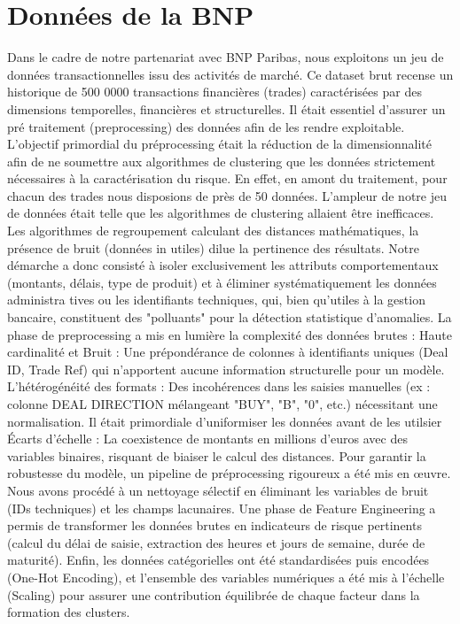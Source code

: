 \documentclass[a4paper]{article}
\begin{document}
\section{Données de la BNP}\label{sec:bnp}
Dans le cadre de notre partenariat avec BNP Paribas, nous exploitons un jeu de données transactionnelles
issu des activités de marché. Ce dataset brut recense un historique de 500 0000 transactions financières (trades)
caractérisées par des dimensions temporelles, financières et structurelles. Il était essentiel d’assurer un pré
traitement (preprocessing) des données afin de les rendre exploitable. L’objectif primordial du préprocessing
était la réduction de la dimensionnalité afin de ne soumettre aux algorithmes de clustering que les données
strictement nécessaires à la caractérisation du risque. En effet, en amont du traitement, pour chacun des trades
nous disposions de près de 50 données. L’ampleur de notre jeu de données était telle que les algorithmes de
clustering allaient être inefficaces.
Les algorithmes de regroupement calculant des distances mathématiques, la présence de bruit (données in
utiles) dilue la pertinence des résultats. Notre démarche a donc consisté à isoler exclusivement les attributs
comportementaux (montants, délais, type de produit) et à éliminer systématiquement les données administra
tives ou les identifiants techniques, qui, bien qu’utiles à la gestion bancaire, constituent des "polluants" pour la
détection statistique d’anomalies.
La phase de preprocessing a mis en lumière la complexité des données brutes :
Haute cardinalité et Bruit : Une prépondérance de colonnes à identifiants uniques (Deal ID, Trade Ref) qui
n’apportent aucune information structurelle pour un modèle.
L’hétérogénéité des formats : Des incohérences dans les saisies manuelles (ex : colonne DEAL DIRECTION
mélangeant "BUY", "B", "0", etc.) nécessitant une normalisation. Il était primordiale d’uniformiser les données
avant de les utilsier
Écarts d’échelle : La coexistence de montants en millions d’euros avec des variables binaires, risquant de
biaiser le calcul des distances.
Pour garantir la robustesse du modèle, un pipeline de préprocessing rigoureux a été mis en œuvre. Nous avons
procédé à un nettoyage sélectif en éliminant les variables de bruit (IDs techniques) et les champs lacunaires. Une
phase de Feature Engineering a permis de transformer les données brutes en indicateurs de risque pertinents
(calcul du délai de saisie, extraction des heures et jours de semaine, durée de maturité). Enfin, les données
catégorielles ont été standardisées puis encodées (One-Hot Encoding), et l’ensemble des variables numériques a
été mis à l’échelle (Scaling) pour assurer une contribution équilibrée de chaque facteur dans la formation des
clusters.
\end{document}
